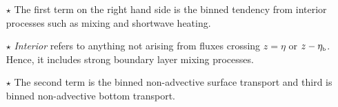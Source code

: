 \documentclass[10pt]{beamer}
\begin{document}
\begin{frame}
\begin{itemize}
\item[$\star$] The first term on the right hand side is the binned tendency from
interior processes such as mixing and shortwave heating.  

\item[$\star$] {\it Interior} refers to anything not arising from
  fluxes crossing $z=\eta$ or $z-\eta_{\mbox{\tiny b}}$.  Hence, it
  includes strong boundary layer mixing processes.

\item[$\star$] The second term is the binned non-advective surface
transport and third is binned non-advective bottom transport.  

\end{itemize}


\end{frame}
\end{document}
